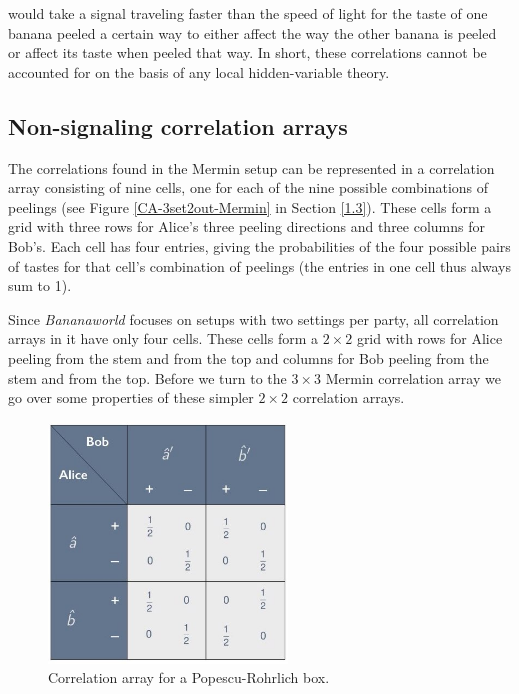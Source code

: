 would take a signal traveling faster than the speed of light for the taste of one banana peeled a certain way to either affect the way the other banana is peeled or affect its taste when peeled that way. In short, these correlations cannot be accounted for on the basis of any local hidden-variable theory. 

\subsection{Non-signaling correlation arrays} \label{1.2}

The correlations found in the Mermin setup can be represented in a correlation array consisting of nine cells, one for each of the nine possible combinations of peelings (see Figure \ref{CA-3set2out-Mermin} in Section \ref{1.3}). These cells form a grid with three rows for Alice's three peeling directions and three columns for Bob's. Each cell has four entries, giving the probabilities of the four possible pairs of tastes for that cell's combination of peelings (the entries in one cell thus always sum to 1). 

Since \emph{Bananaworld} focuses on setups with two settings per party, all correlation arrays in it have only four cells. These cells form a $2 \times 2$ grid with rows for Alice peeling from the stem and from the top and columns for Bob peeling from the stem and from the top. Before we turn to the $3 \times 3$ Mermin correlation array we go over some properties of these simpler $2 \times 2$ correlation arrays. 

\begin{figure}[ht]
 \centering
   \includegraphics[width=2.5in]{CA-PRbox.jpeg} 
   \caption{Correlation array for a Popescu-Rohrlich box.}
   \label{CA-PRbox}
\end{figure}  

